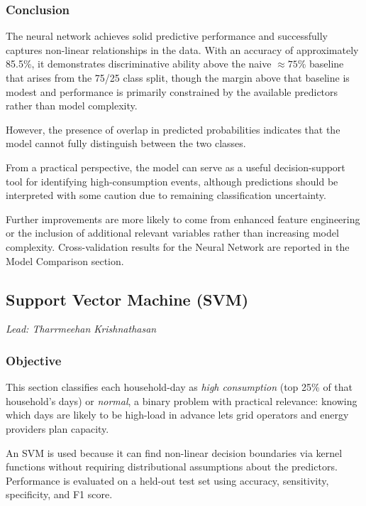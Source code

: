 \documentclass[
]{article}
\begin{document}
\subsubsection{Conclusion}\label{conclusion-4}

The neural network achieves solid predictive performance and
successfully captures non-linear relationships in the data. With an
accuracy of approximately 85.5\%, it demonstrates discriminative ability
above the naive \(\approx 75\)\% baseline that arises from the 75/25
class split, though the margin above that baseline is modest and
performance is primarily constrained by the available predictors rather
than model complexity.

However, the presence of overlap in predicted probabilities indicates
that the model cannot fully distinguish between the two classes.

From a practical perspective, the model can serve as a useful
decision-support tool for identifying high-consumption events, although
predictions should be interpreted with some caution due to remaining
classification uncertainty.

Further improvements are more likely to come from enhanced feature
engineering or the inclusion of additional relevant variables rather
than increasing model complexity. Cross-validation results for the
Neural Network are reported in the Model Comparison section.

\subsection{Support Vector Machine (SVM)}\label{svm}

\emph{Lead: Tharrmeehan Krishnathasan}

\subsubsection{Objective}\label{objective-5}

This section classifies each household-day as \emph{high consumption}
(top 25\% of that household's days) or \emph{normal}, a binary problem
with practical relevance: knowing which days are likely to be high-load
in advance lets grid operators and energy providers plan capacity.

An SVM is used because it can find non-linear decision boundaries via
kernel functions without requiring distributional assumptions about the
predictors. Performance is evaluated on a held-out test set using
accuracy, sensitivity, specificity, and F1 score.
\end{document}
